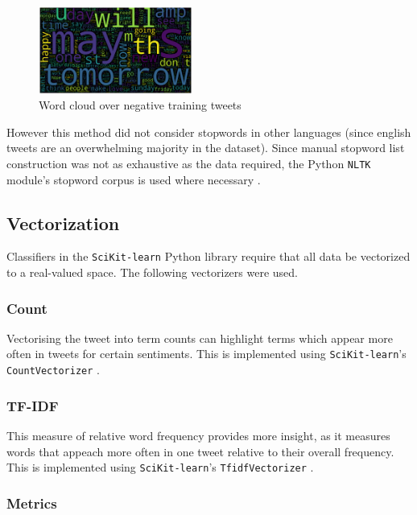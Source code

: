 \documentclass[11pt]{article}
\begin{document}
\begin{figure}[!h]
	\centering
	\includegraphics[width = 0.45\textwidth]{wc/negative-clean-default.png}
	\caption{Word cloud over negative training tweets}
	\label{fig:wc-neg}
\end{figure} 

However this method did not consider stopwords in other languages (since english tweets are an overwhelming majority in the dataset).
Since manual stopword list construction was not as exhaustive as the data required,
the {P}ython \texttt{NLTK} module's stopword corpus is used where necessary \cite{nltk}.

\subsection{Vectorization}

Classifiers in the \texttt{SciKit-learn} {P}ython library require that all data be vectorized to a real-valued space.
The following vectorizers were used.

\subsubsection{Count}

Vectorising the tweet into term counts can highlight terms which appear more often in tweets for certain sentiments.
This is implemented using \texttt{SciKit-learn}'s \texttt{CountVectorizer} \cite{skl}.

\subsubsection{TF-IDF}

This measure of relative word frequency provides more insight, 
as it measures words that appeach more often in one tweet relative to their overall frequency.
This is implemented using \texttt{SciKit-learn}'s \texttt{TfidfVectorizer} \cite{skl}.

\subsubsection{Metrics}
\end{document}
